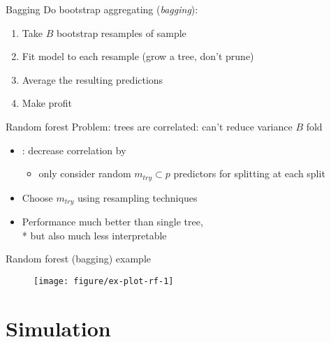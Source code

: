 \documentclass{beamer}
\begin{document}
\begin{frame}[c]{Bagging}
  Do bootstrap aggregating (\emph{bagging}):
  \begin{enumerate}[<+->]
    \item Take $B$ bootstrap resamples of sample
    \item Fit model to each resample (grow a tree, don't prune)
    \item Average the resulting predictions
    \item Make profit 
  \end{enumerate}
\end{frame}

\begin{frame}{Random forest}
  Problem: trees are correlated: can't reduce variance $B$ fold
  \begin{itemize}[<+->]
    \item \textcite{rf}: decrease correlation by 
    \begin{itemize}
      \item only consider random $m_{try} \subset p$ predictors for splitting at each split
    \end{itemize}
    \item Choose $m_{try}$ using resampling techniques
    \item Performance much better than single tree, \\* but also much less interpretable
  \end{itemize}
\end{frame}

\begin{frame}{Random forest (bagging) example}
  
  \begin{figure}[!htb]
  \begin{center}
    \texttt{[image: figure/ex-plot-rf-1]}
  \end{center}
  \end{figure}
  
\end{frame}



\section{Simulation} %
\label{sec:simulation}
\end{document}
